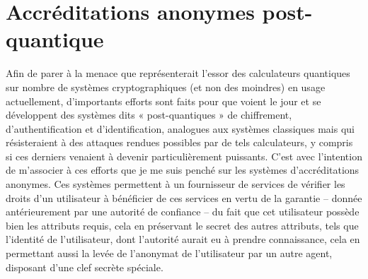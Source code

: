 
\section{Accréditations anonymes post-quantique} %

Afin de parer à la menace que représenterait l’essor des calculateurs quantiques sur nombre de systèmes cryptographiques
(et non des moindres) en usage actuellement, d’importants efforts sont faits pour que voient le jour et se développent des
systèmes dits « post-quantiques » de chiffrement, d’authentification et d’identification, analogues aux systèmes classiques
mais qui résisteraient à des attaques rendues possibles par de tels calculateurs, y compris si ces derniers venaient à
devenir particulièrement puissants.
C’est avec l’intention de m’associer à ces efforts que je me suis penché sur les systèmes d’accréditations anonymes. Ces
systèmes permettent à un fournisseur de services de vérifier les droits d’un utilisateur à bénéficier de ces services en
vertu de la garantie – donnée antérieurement par une autorité de confiance – du fait que cet utilisateur possède bien
les attributs requis, cela en préservant le secret des autres attributs, tels que l’identité de l’utilisateur, dont l’autorité
aurait eu à prendre connaissance, cela en permettant aussi la levée de l’anonymat de l’utilisateur par un autre agent,
disposant d’une clef secrète spéciale.

